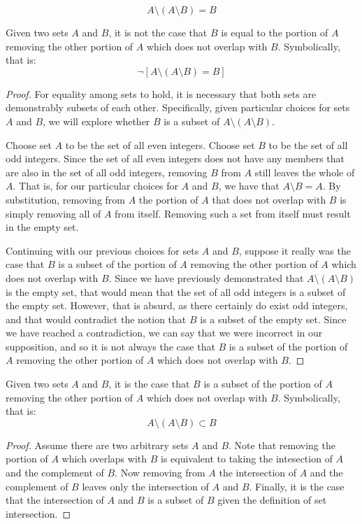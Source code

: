 \documentclass[main.tex]{subfiles}
\begin{document}
\subproblem{}\label{2e}
\[A \setminus (A \setminus B) = B\]
\begin{thm}
	Given two sets \(A\) and \(B\), it is not the case that \(B\) is equal
	to the portion of \(A\) removing the other portion of \(A\) which does
	not overlap with \(B\). Symbolically, that is:
	\[\neg [A \setminus (A \setminus B) = B]\]
\end{thm}
\begin{proof}
	For equality among sets to hold, it is necessary that both sets are
	demonstrably subsets of each other. Specifically, given particular
	choices for sets \(A\) and \(B\), we will explore whether \(B\) is a
	subset of \(A \setminus (A \setminus B)\).

	Choose set \(A\) to be the set of all even integers. Choose set \(B\) to
	be the set of all odd integers. Since the set of all even integers does
	not have any members that are also in the set of all odd integers,
	removing \(B\) from \(A\) still leaves the whole of \(A\). That is, for
	our particular choices for \(A\) and \(B\), we have that
	\(A \setminus B = A\). By substitution, removing from \(A\) the portion
	of \(A\) that does not overlap with \(B\) is simply removing all of
	\(A\) from itself. Removing such a set from itself must result in the
	empty set.

	Continuing with our previous choices for sets \(A\) and \(B\), suppose
	it really was the case that \(B\) is a subset of the portion of \(A\)
	removing the other portion of \(A\) which does not overlap with \(B\).
	Since we have previously demonstrated that
	\(A \setminus (A \setminus B)\) is the empty set, that would mean that
	the set of all odd integers is a subset of the empty set. However, that
	is absurd, as there certainly do exist odd integers, and that would
	contradict the notion that \(B\) is a subset of the empty set. Since we
	have reached a contradiction, we can say that we were incorrect in our
	supposition, and so it is not always the case that \(B\) is a subset of
	the portion of \(A\) removing the other portion of \(A\) which does not
	overlap with \(B\).
\end{proof}

\begin{thm}
	Given two sets \(A\) and \(B\), it is the case that \(B\) is a subset of
	the portion of \(A\) removing the other portion of \(A\) which does not
	overlap with \(B\). Symbolically, that is:
	\[A \setminus (A \setminus B) \subset B\]
\end{thm}
\begin{proof}
	Assume there are two arbitrary sets \(A\) and \(B\). Note that removing
	the portion of \(A\) which overlaps with \(B\) is equivalent to taking
	the intesection of \(A\) and the complement of \(B\). Now removing from
	\(A\) the intersection of \(A\) and the complement of \(B\) leaves only
	the intersection of \(A\) and \(B\). Finally, it is the case that the
	intersection of \(A\) and \(B\) is a subset of \(B\) given the
	definition of set intersection.
\end{proof}
\end{document}
